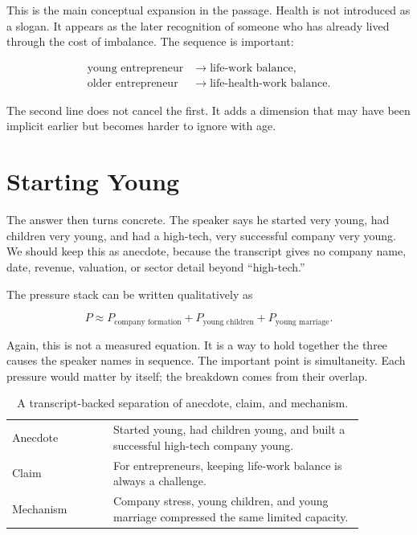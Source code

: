 This is the main conceptual expansion in the passage. Health is not introduced as a slogan. It appears as the later recognition of someone who has already lived through the cost of imbalance. The sequence is important:

\begin{align}
\text{young entrepreneur} &\longrightarrow \text{life-work balance},\\
\text{older entrepreneur} &\longrightarrow \text{life-health-work balance}.
\end{align}

The second line does not cancel the first. It adds a dimension that may have been implicit earlier but becomes harder to ignore with age.

\section{Starting Young}

The answer then turns concrete. The speaker says he started very young, had children very young, and had a high-tech, very successful company very young. We should keep this as anecdote, because the transcript gives no company name, date, revenue, valuation, or sector detail beyond ``high-tech.''

The pressure stack can be written qualitatively as

\begin{equation}
P
\approx
P_{\text{company formation}}
+
P_{\text{young children}}
+
P_{\text{young marriage}}.
\end{equation}

Again, this is not a measured equation. It is a way to hold together the three causes the speaker names in sequence. The important point is simultaneity. Each pressure would matter by itself; the breakdown comes from their overlap.

\begin{table}
\centering
\begin{tabular}{p{0.25\linewidth} p{0.62\linewidth}}
\hline
Anecdote & Started young, had children young, and built a successful high-tech company young.\\
Claim & For entrepreneurs, keeping life-work balance is always a challenge.\\
Mechanism & Company stress, young children, and young marriage compressed the same limited capacity.\\
\hline
\end{tabular}
\caption{A transcript-backed separation of anecdote, claim, and mechanism.}
\end{table}

